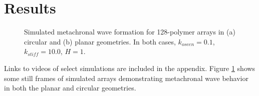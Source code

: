 \documentclass[11pt]{ucthesis}
\begin{document}
\section{Results}
\label{sec:results}

\begin{figure}
\centering
{}
\qquad
{}
\caption{Simulated metachronal wave formation for 128-polymer arrays in (a) circular and (b) planar geometries. 
In both cases, $k_{oseen} = 0.1$, $k_{stiff}  = 10.0$, $H=1$.
\label{fig:anims}}
\end{figure}
Links to videos of select simulations are included in the appendix. Figure \ref{fig:anims} shows some still frames of simulated
arrays demonstrating metachronal wave behavior in both the planar
and circular geometries.

\end{document}
